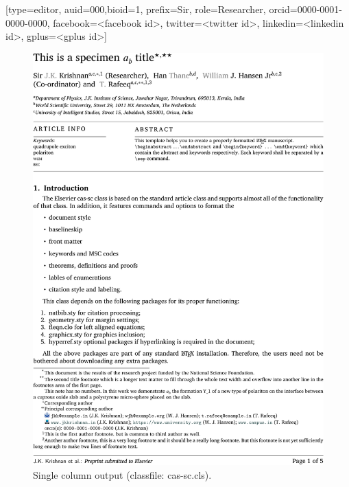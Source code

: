 \documentclass[a4paper,12pt]{article}
\begin{document}
\begin{vquote}
\author[1,3]{Author Name}[type=editor,
    auid=000,bioid=1,
    prefix=Sir,
    role=Researcher,
    orcid=0000-0001-0000-0000,
    facebook=<facebook id>,
    twitter=<twitter id>,
    linkedin=<linkedin id>,
    gplus=<gplus id>]
\end{vquote}

\begin{figure}
\includegraphics[width=\textwidth]{sc-sample.pdf}
\caption{Single column output (classfile: cas-sc.cls).}
\end{figure}
\end{document}
